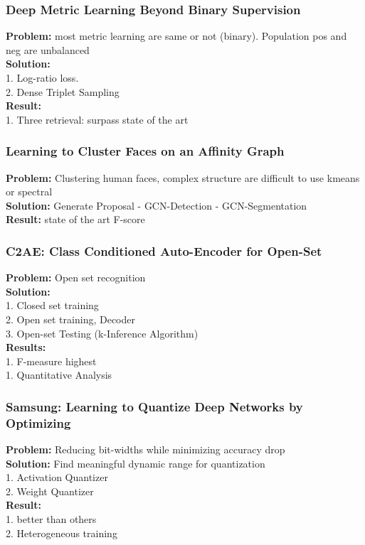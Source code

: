 \subsubsection{Deep Metric Learning Beyond Binary Supervision}
    {\bf Problem:} most metric learning are same or not (binary). Population pos and neg are unbalanced \\
    {\bf Solution:}  \\
        1. Log-ratio loss. \\
        2. Dense Triplet Sampling \\
    {\bf Result:} \\
        1. Three retrieval: surpass state of the art \\
\subsubsection{Learning to Cluster Faces on an Affinity Graph}
    {\bf Problem:} Clustering human faces, complex structure are difficult to use kmeans or spectral \\
    {\bf Solution:} Generate Proposal - GCN-Detection - GCN-Segmentation \\
    {\bf Result:} state of the art F-score \\
\subsubsection{C2AE: Class Conditioned Auto-Encoder for Open-Set}
    {\bf Problem:} Open set recognition \\
    {\bf Solution:}  \\
        1. Closed set training \\
        2. Open set training, Decoder \\
        3. Open-set Testing (k-Inference Algorithm) \\
    {\bf Results:} \\
        1. F-measure highest \\
            1. Quantitative Analysis \\
\subsubsection{Samsung: Learning to Quantize Deep Networks by Optimizing}
    {\bf Problem:} Reducing bit-widths while minimizing accuracy drop \\
    {\bf Solution:} Find meaningful dynamic range for quantization \\
        1. Activation Quantizer \\
        2. Weight Quantizer \\
    {\bf Result:}  \\
        1. better than others \\
        2. Heterogeneous training \\
